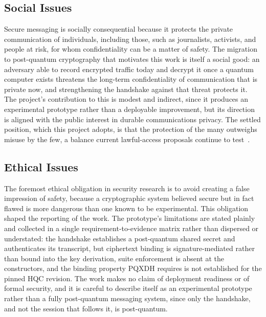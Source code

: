 \subsection{Social Issues}
\label{subsec:lsepi-social}

Secure messaging is socially consequential because it protects the private communication of individuals, including those, such as journalists, activists, and people at risk, for whom confidentiality can be a matter of safety. The migration to post-quantum cryptography that motivates this work is itself a social good: an adversary able to record encrypted traffic today and decrypt it once a quantum computer exists threatens the long-term confidentiality of communication that is private now, and strengthening the handshake against that threat protects it. The project's contribution to this is modest and indirect, since it produces an experimental prototype rather than a deployable improvement, but its direction is aligned with the public interest in durable communications privacy. The settled position, which this project adopts, is that the protection of the many outweighs misuse by the few, a balance current lawful-access proposals continue to test~\cite{noauthor_proposal_2022}.

\subsection{Ethical Issues}
\label{subsec:lsepi-ethical}

The foremost ethical obligation in security research is to avoid creating a false impression of safety, because a cryptographic system believed secure but in fact flawed is more dangerous than one known to be experimental. This obligation shaped the reporting of the work. The prototype's limitations are stated plainly and collected in a single requirement-to-evidence matrix rather than dispersed or understated: the handshake establishes a post-quantum shared secret and authenticates its transcript, but ciphertext binding is signature-mediated rather than bound into the key derivation, suite enforcement is absent at the constructors, and the binding property PQXDH requires is not established for the pinned HQC revision. The work makes no claim of deployment readiness or of formal security, and it is careful to describe itself as an experimental prototype rather than a fully post-quantum messaging system, since only the handshake, and not the session that follows it, is post-quantum.

